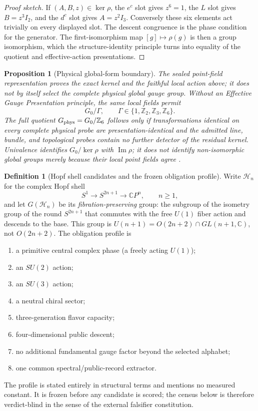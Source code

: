 \documentclass[11pt]{article}
\theoremstyle{plain}
\newtheorem{proposition}[theorem]{Proposition}
\theoremstyle{definition}
\newtheorem{definition}[theorem]{Definition}
\theoremstyle{remark}
\newenvironment{proofsketch}{\begin{proof}[Proof sketch]}{\end{proof}}
\newcommand{\C}{\mathbb{C}}
\begin{document}
\begin{proofsketch}
If \((A,B,z)\in\ker\rho\), the \(e^c\) slot gives \(z^6=1\), the \(L\) slot gives \(B=z^3I_2\), and the \(d^c\) slot gives \(A=z^2I_3\). Conversely these six elements act trivially on every displayed slot. The descent congruence is the phase condition for the generator. The first-isomorphism map \([g]\mapsto\rho(g)\) is then a group isomorphism, which the structure-identity principle turns into equality of the quotient and effective-action presentations.
\end{proofsketch}

\begin{proposition}[Physical global-form boundary]
The sealed point-field representation proves the exact kernel and the faithful local action above; it does not by itself select the complete physical global gauge group. Without an \emph{Effective Gauge Presentation} principle, the same local fields permit
\[
G_0/\Gamma,
\qquad
\Gamma\in\{1,\mathbb Z_2,\mathbb Z_3,\mathbb Z_6\}.
\]
The full quotient \(G_{\rm phys}=G_0/\mathbb Z_6\) follows only if transformations identical on every complete physical probe are presentation-identical and the admitted line, bundle, and topological probes contain no further detector of the residual kernel. Univalence identifies \(G_0/\ker\rho\) with \(\operatorname{Im}\rho\); it does not identify non-isomorphic global groups merely because their local point fields agree \cite{tong-lines}.
\end{proposition}

\begin{definition}[Hopf shell candidates and the frozen obligation profile]
Write \(\mathcal H_n\) for the complex Hopf shell
\[
S^1\longrightarrow S^{2n+1}\longrightarrow \C P^n,
\qquad n\ge1,
\]
and let \(G(\mathcal H_n)\) be its \emph{fibration-preserving} group: the subgroup of the isometry group of the round \(S^{2n+1}\) that commutes with the free \(U(1)\) fiber action and descends to the base. This group is \(U(n+1)=O(2n+2)\cap GL(n+1,\C)\), not \(O(2n+2)\). The obligation profile is
\begin{enumerate}[label=\textup{O\arabic*},leftmargin=2.2em,itemsep=0pt]
\item a primitive central complex phase (a freely acting \(U(1)\));
\item an \(SU(2)\) action;
\item an \(SU(3)\) action;
\item a neutral chiral sector;
\item three-generation flavor capacity;
\item four-dimensional public descent;
\item no additional fundamental gauge factor beyond the selected alphabet;
\item one common spectral/public-record extractor.
\end{enumerate}
The profile is stated entirely in structural terms and mentions no measured constant. It is frozen before any candidate is scored; the census below is therefore verdict-blind in the sense of the external falsifier constitution.
\end{definition}
\end{document}
